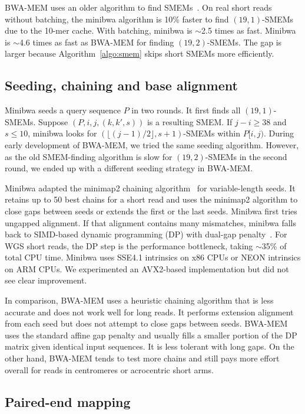 \documentclass[webpdf,contemporary,large,namedate]{oup-authoring-template}%
\begin{document}
BWA-MEM uses an older algorithm to find SMEMs~\citep{Li:2012fk}.
On real short reads without batching, the minibwa algorithm is 10\% faster to find $(19,1)$-SMEMs due to the 10-mer cache.
With batching, minibwa is $\sim$2.5 times as fast.
Minibwa is $\sim$4.6 times as fast as BWA-MEM for finding $(19,2)$-SMEMs.
The gap is larger because Algorithm~\ref{algo:smem} skips short SMEMs more efficiently.

\subsection{Seeding, chaining and base alignment}\label{sec:align}

Minibwa seeds a query sequence $P$ in two rounds.
It first finds all $(19,1)$-SMEMs.
Suppose $(P,i,j,(k,k',s))$ is a resulting SMEM.
If $j-i\ge38$ and $s\le10$,
minibwa looks for $(\lfloor(j-1)/2\rfloor,s+1)$-SMEMs within $P[i,j)$.
During early development of BWA-MEM, we tried the same seeding algorithm.
However, as the old SMEM-finding algorithm is slow for $(19,2)$-SMEMs in the second round,
we ended up with a different seeding strategy in BWA-MEM.

Minibwa adapted the minimap2 chaining algorithm~\citep{Li:2018ab} for variable-length seeds.
It retains up to 50 best chains for a short read
and uses the minimap2 algorithm to close gaps between seeds or extends the first or the last seeds.
Minibwa first tries ungapped alignment.
If that alignment contains many mismatches, minibwa falls back to SIMD-based dynamic programming (DP) with dual-gap penalty~\citep{Suzuki:2018aa}.
For WGS short reads, the DP step is the performance bottleneck, taking $\sim$35\% of total CPU time.
Minibwa uses SSE4.1 intrinsics on x86 CPUs or NEON intrinsics on ARM CPUs.
We experimented an AVX2-based implementation but did not see clear improvement.

In comparison, BWA-MEM uses a heuristic chaining algorithm that is less accurate and does not work well for long reads.
It performs extension alignment from each seed but does not attempt to close gaps between seeds.
BWA-MEM uses the standard affine gap penalty and usually fills a smaller portion of the DP matrix given identical input sequences.
It is less tolerant with long gaps.
On the other hand, BWA-MEM tends to test more chains and still pays more effort overall for reads in centromeres or acrocentric short arms.

\subsection{Paired-end mapping}\label{sec:pe}
\end{document}
